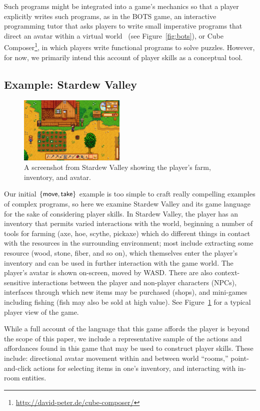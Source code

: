 Such programs might be integrated into a game's mechanics so that a player
explicitly writes such programs, as in the BOTS game, an interactive
programming tutor that asks players to write small imperative programs that
direct an avatar within a virtual world~\cite{hicks2012creation} (see
Figure~\ref{fig:bots}), or Cube
Composer\footnote{\url{http://david-peter.de/cube-composer/}}, in which
players write functional programs to solve puzzles. However, for now, we
primarily intend this account of player skills as a conceptual tool.

\subsection{Example: Stardew Valley}

\begin{figure}
  \includegraphics[width=0.45\textwidth]{stardew-valley.png}
  \caption{A screenshot from Stardew Valley showing the player's farm,
  inventory, and avatar.}
  \label{fig:stardew}
\end{figure}

Our initial $\{\mathsf{move}, \mathsf{take}\}$ example is too simple to craft really
compelling examples of complex programs, so here we examine
Stardew Valley and its game language for the sake of considering player
skills. In Stardew Valley, the player has an inventory that permits varied
interactions with the world, beginning a number of tools for farming (axe,
hoe, scythe, pickaxe) which do different things in contact with the
resources in the surrounding environment; most include extracting some
resource (wood, stone, fiber, and so on), which themselves enter the
player's inventory and can be used in further interaction with the game
world. The player's avatar is shown on-screen, moved by WASD.  There are
also context-sensitive interactions between the player and non-player
characters (NPCs), interfaces through which new items may be purchased
(shops), and mini-games including fishing (fish may also be sold at high
value). See Figure~\ref{fig:stardew} for a typical player view of the game.

While a full account of the language that this game affords the player is
beyond the scope of this paper, we include a representative sample of the
actions and affordances found in this game that may be used to construct
player skills.
These include: directional avatar movement within and between
world ``rooms,'' point-and-click actions for selecting items in
one's inventory, and interacting with in-room entities. 

